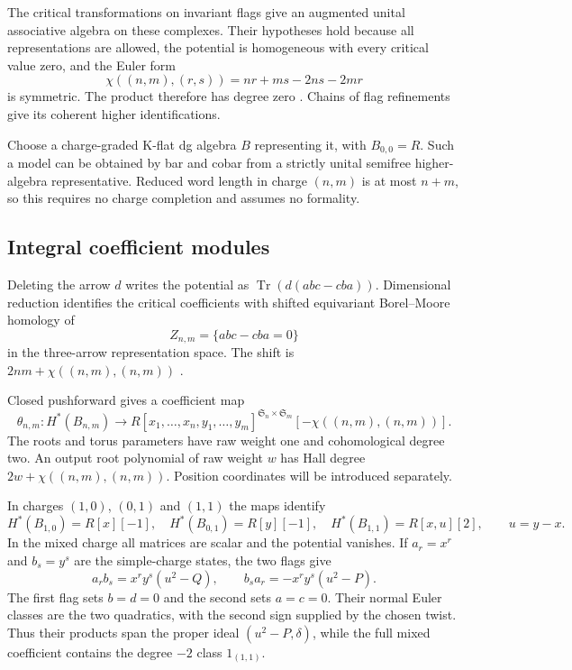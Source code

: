 The critical transformations on invariant flags give an augmented
unital associative algebra on these complexes. Their hypotheses
hold because all representations are allowed, the potential is
homogeneous with every critical value zero, and the Euler form
\[
 \chi((n,m),(r,s))=nr+ms-2ns-2mr
\]
is symmetric. The product therefore has degree zero
\cite[\S3.2]{DavisonCriticalCoHA}.
Chains of flag refinements give its coherent higher
identifications.

Choose a charge-graded K-flat dg algebra $B$
representing it, with $B_{0,0}=R$.
Such a model can be obtained by bar and cobar from a strictly
unital semifree higher-algebra representative. Reduced word length
in charge $(n,m)$ is at most $n+m$, so this requires no charge
completion and assumes no formality.

\subsection{Integral coefficient modules}

Deleting the arrow $d$ writes the potential as
$\operatorname{Tr}(d(abc-cba))$. Dimensional reduction identifies
the critical coefficients with shifted equivariant Borel--Moore
homology of
\[
 Z_{n,m}=\{abc-cba=0\}
\]
in the three-arrow representation space. The shift is
$2nm+\chi((n,m),(n,m))$
\cite[Theorem~A.1 and Corollary~A.9]{DavisonCriticalCoHA}.

Closed pushforward gives a coefficient map
\begin{equation}\label{cyrec:eq:hall-coefficient}
 \theta_{n,m}:H^*(B_{n,m})\longrightarrow
 R[x_1,\ldots,x_n,y_1,\ldots,y_m]^{\mathfrak S_n\times\mathfrak S_m}
                   [-\chi((n,m),(n,m))].
\end{equation}
The roots and torus parameters have raw weight one and
cohomological degree two. An output root polynomial of raw
weight $w$ has Hall degree $2w+\chi((n,m),(n,m))$.
Position coordinates will be introduced separately.

In charges $(1,0)$, $(0,1)$ and $(1,1)$ the maps identify
\begin{equation}\label{cyrec:eq:small-coefficients}
 H^*(B_{1,0})=R[x][-1],\quad
 H^*(B_{0,1})=R[y][-1],\quad
 H^*(B_{1,1})=R[x,u][2],\qquad u=y-x.
\end{equation}
In the mixed charge all matrices are scalar and the potential
vanishes. If $a_r=x^r$ and $b_s=y^s$ are the simple-charge
states, the two flags give
\begin{equation}\label{cyrec:eq:mixed-hall-product}
 a_rb_s=x^ry^s(u^2-Q),\qquad
 b_sa_r=-x^ry^s(u^2-P).
\end{equation}
The first flag sets $b=d=0$ and the second sets $a=c=0$.
Their normal Euler classes are the two quadratics, with the
second sign supplied by the chosen twist.
Thus their products span the proper ideal
$(u^2-P,\delta)$, while the full mixed coefficient contains
the degree $-2$ class $1_{(1,1)}$.

